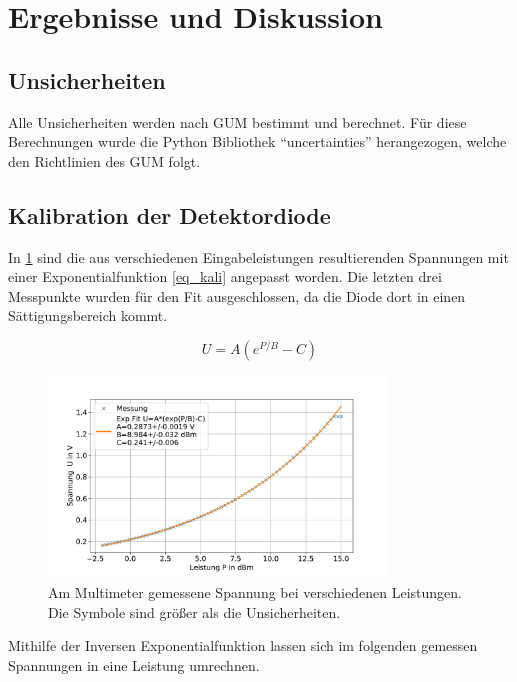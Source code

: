 \documentclass[
	a4paper,
	12pt,
	pagesize,
	ngerman
]{scrartcl}
\begin{document}
	\section{Ergebnisse und Diskussion}


	\subsection{Unsicherheiten}
	Alle Unsicherheiten werden nach GUM bestimmt und berechnet.
	Für diese Berechnungen wurde die Python Bibliothek \enquote{uncertainties} herangezogen, welche den Richtlinien des GUM folgt.

	\subsection{Kalibration der Detektordiode}
	In \cref{fig_diode_kali} sind die aus verschiedenen Eingabeleistungen resultierenden Spannungen mit einer Exponentialfunktion \cref{eq_kali} angepasst worden.
	Die letzten drei Messpunkte wurden für den Fit ausgeschlossen, da die Diode dort in einen Sättigungsbereich kommt.

	\begin{equation}
		\label{eq_kali}
		U = A(e^{P/B}-C)
	\end{equation}

	\begin{figure}[H]
		\includegraphics[width=0.8\textwidth]{img/diode-kali}
		\centering
		\caption{
			Am Multimeter gemessene Spannung bei verschiedenen Leistungen.
			Die Symbole sind größer als die Unsicherheiten.
		}
		\label{fig_diode_kali}
		\centering
	\end{figure}
	Mithilfe der Inversen Exponentialfunktion \label{eq_inv_kali} lassen sich im folgenden gemessen Spannungen in eine Leistung umrechnen.
\end{document}
